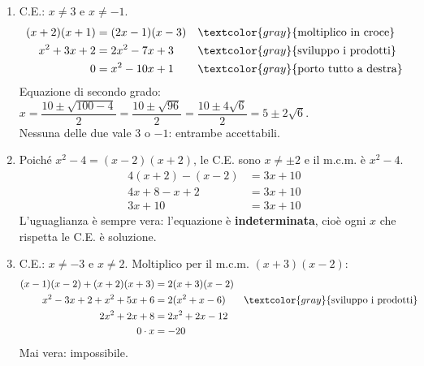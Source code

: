 \begin{question}[ID=3.5, subtitle={Equazioni frazionarie con più denominatori}, difficulty=difficile, tags={equazioni frazionarie}]
\begin{explanation}
\begin{enumerate}
\[\begin{aligned}
    0\cdot x &= -3
    \end{aligned}\]
    Mai vera: impossibile.
    \item C.E.: $x\neq3$ e $x\neq-1$.
    \[\begin{aligned}
    (x+2)(x+1) &= (2x-1)(x-3) && \textcolor{gray}{\text{moltiplico in croce}}\\
    x^2+3x+2 &= 2x^2-7x+3 && \textcolor{gray}{\text{sviluppo i prodotti}}\\
    0 &= x^2-10x+1 && \textcolor{gray}{\text{porto tutto a destra}}
    \end{aligned}\]
    Equazione di secondo grado: $x=\dfrac{10\pm\sqrt{100-4}}{2}=\dfrac{10\pm\sqrt{96}}{2}=\dfrac{10\pm4\sqrt6}{2}=5\pm2\sqrt6$. \\
    Nessuna delle due vale $3$ o $-1$: entrambe accettabili.
    \item Poiché $x^2-4=(x-2)(x+2)$, le C.E. sono $x\neq\pm2$ e il m.c.m. è $x^2-4$.
    \[\begin{aligned}
    4(x+2)-(x-2) &= 3x+10\\
    4x+8-x+2 &= 3x+10\\
    3x+10 &= 3x+10
    \end{aligned}\]
    L'uguaglianza è sempre vera: l'equazione è \textbf{indeterminata}, cioè ogni $x$ che rispetta le C.E. è soluzione.
    \item C.E.: $x\neq-3$ e $x\neq2$. Moltiplico per il m.c.m. $(x+3)(x-2)$:
    \[\begin{aligned}
    (x-1)(x-2)+(x+2)(x+3) &= 2(x+3)(x-2)\\
    x^2-3x+2+x^2+5x+6 &= 2(x^2+x-6) && \textcolor{gray}{\text{sviluppo i prodotti}}\\
    2x^2+2x+8 &= 2x^2+2x-12\\
    0\cdot x &= -20
    \end{aligned}\]
    Mai vera: impossibile.
\end{enumerate}
\end{explanation}
\end{question}


